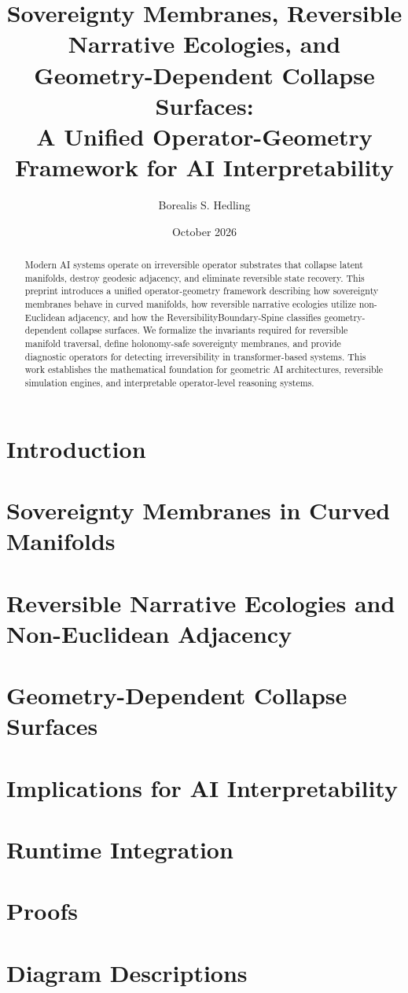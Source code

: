 \documentclass[11pt]{article}
\title{Sovereignty Membranes, Reversible Narrative Ecologies, and Geometry-Dependent Collapse Surfaces:\\
A Unified Operator-Geometry Framework for AI Interpretability}
\author{Borealis S. Hedling}
\date{October 2026}
\begin{document}
\maketitle

\begin{abstract}
Modern AI systems operate on irreversible operator substrates that collapse latent
manifolds, destroy geodesic adjacency, and eliminate reversible state recovery.
This preprint introduces a unified operator-geometry framework describing how
sovereignty membranes behave in curved manifolds, how reversible narrative
ecologies utilize non-Euclidean adjacency, and how the ReversibilityBoundary-Spine
classifies geometry-dependent collapse surfaces. We formalize the invariants
required for reversible manifold traversal, define holonomy-safe sovereignty
membranes, and provide diagnostic operators for detecting irreversibility in
transformer-based systems. This work establishes the mathematical foundation for
geometric AI architectures, reversible simulation engines, and interpretable
operator-level reasoning systems.
\end{abstract}

\tableofcontents

\section{Introduction}


\section{Sovereignty Membranes in Curved Manifolds}


\section{Reversible Narrative Ecologies and Non-Euclidean Adjacency}


\section{Geometry-Dependent Collapse Surfaces}


\section{Implications for AI Interpretability}


\appendix

\section{Runtime Integration}


\section{Proofs}


\section{Diagram Descriptions}




\end{document}
